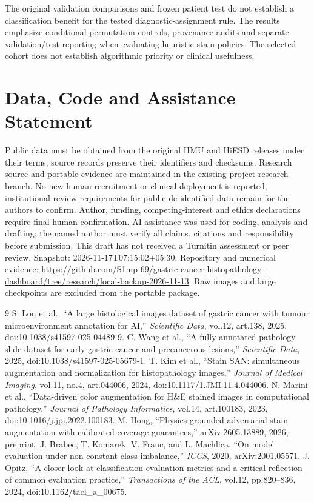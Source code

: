 \documentclass[conference]{IEEEtran}
\begin{document}
The original validation comparisons and frozen patient test do not establish a classification benefit for the tested diagnostic-assignment rule. The results emphasize conditional permutation controls, provenance audits and separate validation/test reporting when evaluating heuristic stain policies. The selected cohort does not establish algorithmic priority or clinical usefulness.

\section*{Data, Code and Assistance Statement}
Public data must be obtained from the original HMU and HiESD releases under their terms; source records preserve their identifiers and checksums. Research source and portable evidence are maintained in the existing project research branch. No new human recruitment or clinical deployment is reported; institutional review requirements for public de-identified data remain for the authors to confirm. Author, funding, competing-interest and ethics declarations require final human confirmation. AI assistance was used for coding, analysis and drafting; the named author must verify all claims, citations and responsibility before submission. This draft has not received a Turnitin assessment or peer review. Snapshot: 2026-11-17T07:15:02+05:30.
Repository and numerical evidence: \url{https://github.com/S1mp-69/gastric-cancer-histopathology-dashboard/tree/research/local-backup-2026-11-13}. Raw images and large checkpoints are excluded from the portable package.
\begin{thebibliography}{9}
 S. Lou et al., ``A large histological images dataset of gastric cancer with tumour microenvironment annotation for AI,'' \emph{Scientific Data}, vol.12, art.138, 2025, doi:10.1038/s41597-025-04489-9.
 C. Wang et al., ``A fully annotated pathology slide dataset for early gastric cancer and precancerous lesions,'' \emph{Scientific Data}, 2025, doi:10.1038/s41597-025-05679-1.
 T. Kim et al., ``Stain SAN: simultaneous augmentation and normalization for histopathology images,'' \emph{Journal of Medical Imaging}, vol.11, no.4, art.044006, 2024, doi:10.1117/1.JMI.11.4.044006.
 N. Marini et al., ``Data-driven color augmentation for H\&E stained images in computational pathology,'' \emph{Journal of Pathology Informatics}, vol.14, art.100183, 2023, doi:10.1016/j.jpi.2022.100183.
 M. Hong, ``Physics-grounded adversarial stain augmentation with calibrated coverage guarantees,'' arXiv:2605.13889, 2026, preprint.
 J. Brabec, T. Komarek, V. Franc, and L. Machlica, ``On model evaluation under non-constant class imbalance,'' \emph{ICCS}, 2020, arXiv:2001.05571.
 J. Opitz, ``A closer look at classification evaluation metrics and a critical reflection of common evaluation practice,'' \emph{Transactions of the ACL}, vol.12, pp.820--836, 2024, doi:10.1162/tacl\_a\_00675.
\end{thebibliography}
\end{document}
